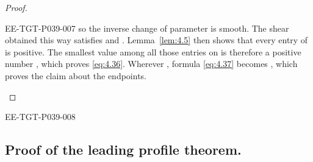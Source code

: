 \begin{proof}
\begin{EESegment}{EE-TGT-P039-007}
so the inverse change of parameter is smooth. The shear obtained this way satisfies
 and
. Lemma~\ref{lem:4.5} then shows that every
entry of  is positive. The smallest value among all those
entries on  is therefore
a positive number , which proves \eqref{eq:4.36}. Wherever
, formula \eqref{eq:4.37} becomes
, which proves the claim about the endpoints.
\end{EESegment}
\end{proof}

\begin{EESegment}{EE-TGT-P039-008}
\subsection{Proof of the leading profile theorem.}\label{sec:4.6}
\end{EESegment}


